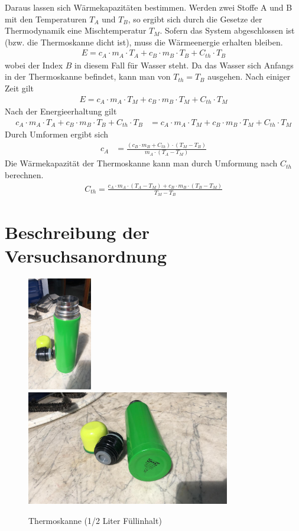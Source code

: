\documentclass{article}
\begin{document}
Daraus lassen sich Wärmekapazitäten bestimmen. Werden zwei Stoffe A und B mit den Temperaturen $T_A$ und $T_B$, so ergibt sich durch die Gesetze der Thermodynamik eine Mischtemperatur $T_M$. Sofern das System abgeschlossen ist (bzw. die Thermoskanne dicht ist), muss die Wärmeenergie erhalten bleiben. 
\begin{align}
E = c_A\cdot m_A \cdot T_A + c_B\cdot m_B \cdot T_B + C_{th} \cdot T_B
\end{align}
wobei der Index $B$ in diesem Fall für Wasser steht. Da das Wasser sich Anfangs in der Thermoskanne befindet, kann man von $T_{th} = T_B$ ausgehen. Nach einiger Zeit gilt
\begin{align}
 E = c_A\cdot m_A \cdot T_M + c_B\cdot m_B \cdot T_M + C_{th} \cdot T_M
\end{align}
Nach der Energieerhaltung gilt
\begin{align}
c_A\cdot m_A \cdot T_A + c_B\cdot m_B \cdot T_B + C_{th} \cdot T_B &=  c_A\cdot m_A \cdot T_M + c_B\cdot m_B \cdot T_M + C_{th} \cdot T_M
\end{align}
Durch Umformen ergibt sich
\begin{align}
\label{eq:ca_formel}
c_A &=  \frac{(c_B\cdot m_B  + C_{th}) \cdot (T_M - T_B)}{m_A \cdot (T_A - T_M)}
\end{align}
Die Wärmekapazität der Thermoskanne kann man durch Umformung nach $C_{th}$ berechnen.
\begin{align}
\label{eq:cth_formel}
C_{th} = \frac{c_A\cdot m_A\cdot (T_A - T_M) + c_B \cdot m_B \cdot (T_B - T_M)}{T_M - T_B}
\end{align}


\section{Beschreibung der Versuchsanordnung}




\begin{figure}[H]
\includegraphics[height=5cm]{thermoskanne.jpg}
\includegraphics[height=5cm]{thermoskanne2.jpg}
\caption{Thermoskanne (1/2 Liter Füllinhalt)}
\end{figure}
\end{document}
